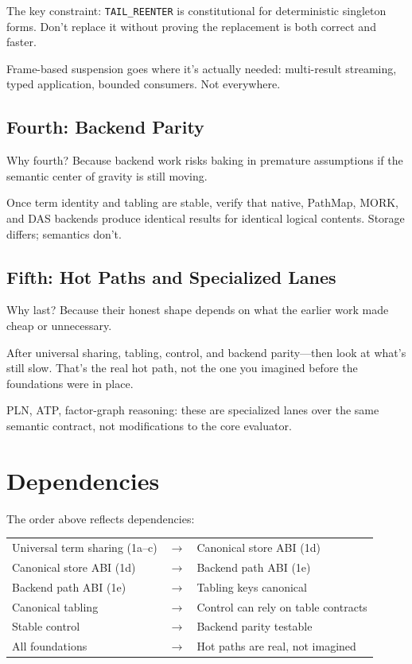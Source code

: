 \documentclass[11pt]{article}
\newcommand{\code}[1]{\texttt{#1}}
\newcommand{\PathMap}{\textup{PathMap}}
\newcommand{\MORK}{\textup{MORK}}
\begin{document}
The key constraint: \code{TAIL\_REENTER} is constitutional for deterministic
singleton forms.  Don't replace it without proving the replacement is
both correct and faster.

Frame-based suspension goes where it's actually needed: multi-result
streaming, typed application, bounded consumers.  Not everywhere.

\subsection{Fourth: Backend Parity}

Why fourth?  Because backend work risks baking in premature assumptions
if the semantic center of gravity is still moving.

Once term identity and tabling are stable, verify that native, \PathMap{},
\MORK{}, and DAS backends produce identical results for identical logical
contents.  Storage differs; semantics don't.

\subsection{Fifth: Hot Paths and Specialized Lanes}

Why last?  Because their honest shape depends on what the earlier work
made cheap or unnecessary.

After universal sharing, tabling, control, and backend parity---then
look at what's still slow.  That's the real hot path, not the one you
imagined before the foundations were in place.

PLN, ATP, factor-graph reasoning: these are specialized lanes over the
same semantic contract, not modifications to the core evaluator.

\section{Dependencies}

The order above reflects dependencies:

\begin{center}
\begin{tabular}{lcl}
Universal term sharing (1a--c) & $\rightarrow$ & Canonical store ABI (1d) \\
Canonical store ABI (1d) & $\rightarrow$ & Backend path ABI (1e) \\
Backend path ABI (1e) & $\rightarrow$ & Tabling keys canonical \\
Canonical tabling & $\rightarrow$ & Control can rely on table contracts \\
Stable control & $\rightarrow$ & Backend parity testable \\
All foundations & $\rightarrow$ & Hot paths are real, not imagined
\end{tabular}
\end{center}
\end{document}
